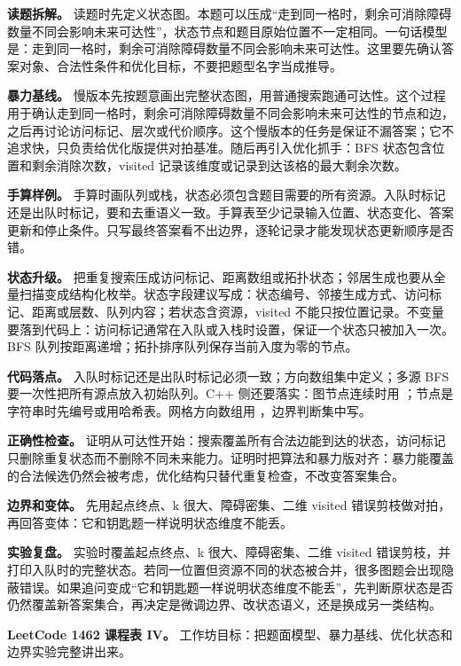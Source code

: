 \textbf{读题拆解。} 读题时先定义状态图。本题可以压成“走到同一格时，剩余可消除障碍数量不同会影响未来可达性”，状态节点和题目原始位置不一定相同。一句话模型是：走到同一格时，剩余可消除障碍数量不同会影响未来可达性。这里要先确认答案对象、合法性条件和优化目标，不要把题型名字当成推导。

\textbf{暴力基线。} 慢版本先按题意画出完整状态图，用普通搜索跑通可达性。这个过程用于确认走到同一格时，剩余可消除障碍数量不同会影响未来可达性的节点和边，之后再讨论访问标记、层次或代价顺序。这个慢版本的任务是保证不漏答案；它不追求快，只负责给优化版提供对拍基准。随后再引入优化抓手：BFS 状态包含位置和剩余消除次数，visited 记录该维度或记录到达该格的最大剩余次数。

\textbf{手算样例。} 手算时画队列或栈，状态必须包含题目需要的所有资源。入队时标记还是出队时标记，要和去重语义一致。手算表至少记录输入位置、状态变化、答案更新和停止条件。只写最终答案看不出边界，逐轮记录才能发现状态更新顺序是否错。

\textbf{状态升级。} 把重复搜索压成访问标记、距离数组或拓扑状态；邻居生成也要从全量扫描变成结构化枚举。状态字段建议写成：状态编号、邻接生成方式、访问标记、距离或层数、队列内容；若状态含资源，visited 不能只按位置记录。不变量要落到代码上：访问标记通常在入队或入栈时设置，保证一个状态只被加入一次。BFS 队列按距离递增；拓扑排序队列保存当前入度为零的节点。

\textbf{代码落点。} 入队时标记还是出队时标记必须一致；方向数组集中定义；多源 BFS 要一次性把所有源点放入初始队列。C++ 侧还要落实：图节点连续时用 ；节点是字符串时先编号或用哈希表。网格方向数组用 ，边界判断集中写。

\textbf{正确性检查。} 证明从可达性开始：搜索覆盖所有合法边能到达的状态，访问标记只删除重复状态而不删除不同未来能力。证明时把算法和暴力版对齐：暴力能覆盖的合法候选仍然会被考虑，优化结构只替代重复检查，不改变答案集合。

\textbf{边界和变体。} 先用起点终点、k 很大、障碍密集、二维 visited 错误剪枝做对拍，再回答变体：它和钥匙题一样说明状态维度不能丢。

\textbf{实验复盘。} 实验时覆盖起点终点、k 很大、障碍密集、二维 visited 错误剪枝，并打印入队时的完整状态。若同一位置但资源不同的状态被合并，很多图题会出现隐蔽错误。如果追问变成“它和钥匙题一样说明状态维度不能丢”，先判断原状态是否仍然覆盖新答案集合，再决定是微调边界、改状态语义，还是换成另一类结构。

\noindent\textbf{LeetCode 1462 课程表 IV。} 工作坊目标：把题面模型、暴力基线、优化状态和边界实验完整讲出来。

